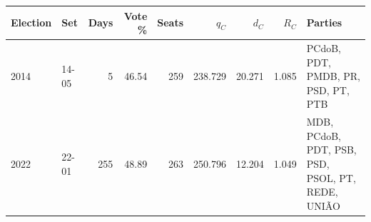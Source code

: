 \begin{tabularx}{\textwidth}{@{}llrrrrrr>{\raggedright\arraybackslash}X@{}}
\toprule
Election & Set & Days & Vote \% & Seats & \(q_C\) & \(d_C\) & \(R_C\) & Parties \\
\midrule
2014 & 14-05 & 5 & 46.54 & 259 & 238.729 & 20.271 & 1.085 & PCdoB, PDT, PMDB, PR, PSD, PT, PTB \\
2022 & 22-01 & 255 & 48.89 & 263 & 250.796 & 12.204 & 1.049 & MDB, PCdoB, PDT, PSB, PSD, PSOL, PT, REDE, UNIÃO \\
\bottomrule
\end{tabularx}
\par{}
